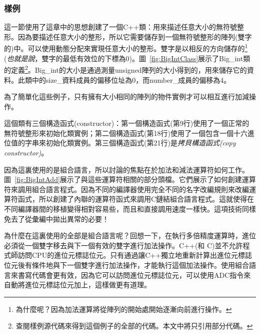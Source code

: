 \subsubsection{樣例}
這一節使用了這章中的思想創建了一個C++類：用來描述任意大小的無符號整形。因為要描述任意大小的整形，所以它需要儲存到一個無符號整形的陣列(雙字的)中。可以使用動態分配來實現任意大小的整形。雙字是以相反的方向儲存的\footnote{為什麼呢？因為加法運算將從陣列的開始處開始逐漸向前進行操作。}  (\emph{也就是說}，雙字的最低有效位的下標為0)。圖~\ref{fig:BigIntClass}展示了{\code Big\_int}類的定義\footnote{查閱樣例源代碼來得到這個例子的全部的代碼。本文中將只引用部分代碼。}。{\code Big\_int}的大小是通過測量{\code unsigned}陣列的大小得到的，用來儲存它的資料。此類中的{\code size\_}資料成員的偏移位址為0，而{\code number\_}成員的偏移為4。

為了簡單化這些例子，只有擁有大小相同的陣列的物件實例才可以相互進行加減操作。

這個類有三個構造函式(constructor)：第一個構造函式(第9行)使用了一個正常的無符號整形來初始化類實例；第二個構造函式(第18行)使用了一個包含一個十六進位值的字串來初始化類實例。第三個構造函式(第21行)是\emph{拷貝構造函式(copy
constructor)}。

因為這裏使用的是組合語言，所以討論的焦點在於加法和減法運算符如何工作。圖~\ref{fig:BigIntAdd}展示了與這些運算符相關的部分頭檔。它們展示了如何創建運算符來調用組合語言程式。因為不同的編譯器使用完全不同的名字改編規則來改編運算符函式，所以創建了內聯的運算符函式來調用C鏈結組合語言程式。這就使得在不同編譯器間的移植變得相對容易些，而且和直接調用速度一樣快。這項技術同樣免去了從彙編中拋出異常的必要！

為什麼在這裏使用的全部是組合語言呢？回想一下，在執行多倍精度運算時，進位必須從一個雙字移去與下一個有效的雙字進行加法操作。C++(和 C)並不允許程式師訪問CPU的進位元標誌位元。只有通過讓C++獨立地重新計算出進位元標誌位元後有條件地與下一個雙字進行加法操作，才能執行這個加法操作。使用組合語言來書寫代碼會更有效，因為它可以訪問進位元標誌位元，可以使用{\code ADC}指令來自動將進位元標誌位元加上，這樣做更有道理。

